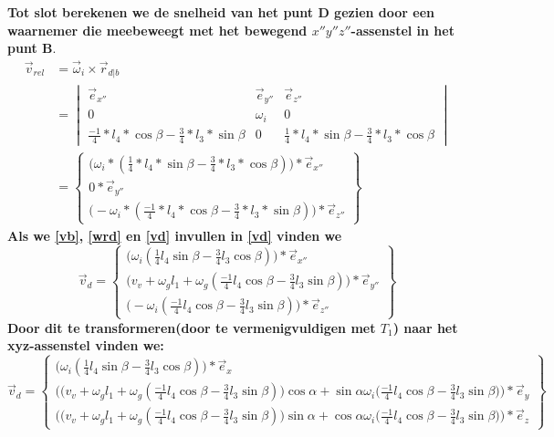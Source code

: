 \documentclass[a4paper,10pt]{article}
\begin{document}
\textbf{Tot slot berekenen we de snelheid van het punt D gezien door een waarnemer die meebeweegt met het bewegend $x''y''z''$-assenstel in het punt B}.\\
\begin{equation}
\label{vrel}
\begin{aligned}
\vec{v}_{rel} &= \vec{\omega}_i \times \vec{r}_{d|b} \\
&=\begin{vmatrix}
\vec{e}_{x''} & \vec{e}_{y''} & \vec{e}_{z''}\\
0 & \omega_i & 0 \\
\frac{-1}{4}*l_4*\cos{\beta} - \frac{3}{4}*l_3 * \sin{\beta} & 0 &\frac{1}{4}*l_4 *\sin{\beta}-\frac{3}{4}*l_3 * \cos{\beta}
\end{vmatrix}\\
&= \begin{Bmatrix}
\Big(\omega_i * (\frac{1}{4}*l_4 *\sin{\beta}-\frac{3}{4}*l_3 * \cos{\beta})\Big) * \vec{e}_{x''}\\
0 *\vec{e}_{y''}\\
\Big(-\omega_i *(\frac{-1}{4}*l_4*\cos{\beta} - \frac{3}{4}*l_3 * \sin{\beta}) \Big)*\vec{e}_{z''}
\end{Bmatrix}
\end{aligned}
\end{equation}
\textbf{Als we \eqref{vb}, \eqref{wrd} en \eqref{vd} invullen in \eqref{vd} vinden we}\\
\begin{equation}
\vec{v}_d = \begin{Bmatrix}
\Big(\omega_i (\frac{1}{4} l_4 \sin{\beta}-\frac{3}{4} l_3  \cos{\beta})\Big) * \vec{e}_{x''}\\
\Big(v_v + \omega_g  l_1 + \omega_g (\frac{-1}{4} l_4 \cos{\beta}-\frac{3}{4} l_3 \sin{\beta}) \Big) *\vec{e}_{y''}\\
\Big(-\omega_i (\frac{-1}{4} l_4 \cos{\beta} - \frac{3}{4} l_3  \sin{\beta}) \Big)*\vec{e}_{z''}
\end{Bmatrix}
\end{equation}
\textbf{Door dit te transformeren(door te vermenigvuldigen met $T_1$) naar het xyz-assenstel vinden we:} \\
\begin{equation}
\vec{v}_d = \begin{Bmatrix}
\Big(\omega_i  (\frac{1}{4}l_4 \sin{\beta}-\frac{3}{4}l_3  \cos{\beta})\Big) * \vec{e}_{x}\\
\Big(\big(v_v + \omega_g  l_1 + \omega_g(\frac{-1}{4} l_4 \cos{\beta}-\frac{3}{4} l_3 \sin{\beta}) \big) \cos{\alpha}  + \sin{\alpha}  \omega_i  \big( \frac{-1}{4}l_4 \cos{\beta} - \frac{3}{4}l_3 \sin{\beta}\big)\Big)*\vec{e}_{y} \\
\Big(\big(v_v + \omega_g   l_1 + \omega_g (\frac{-1}{4} l_4 \cos{\beta}-\frac{3}{4} l_3 \sin{\beta}) \big) \sin{\alpha}  + \cos{\alpha}  \omega_i   \big( \frac{-1}{4} l_4 \cos{\beta} - \frac{3}{4}l_3 \sin{\beta}\big)\Big)*\vec{e}_{z}
\end{Bmatrix}
\end{equation}\\
\end{document}
